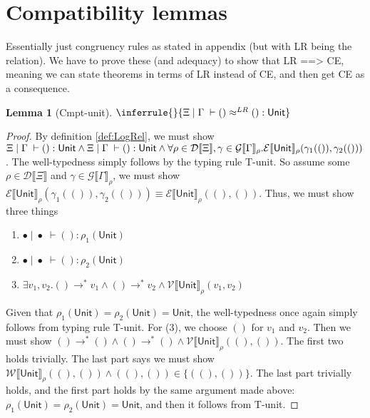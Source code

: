 \documentclass[twoside,11pt,openright]{report}
\newtheorem{lemma}[theorem]{Lemma}
\theoremstyle{definition}
\newcommand{\val}{v}
\newcommand{\TT}{()}
\newcommand{\Tunit}{\mathsf{Unit}}
\newcommand{\venv}{\Gamma}
\newcommand{\tenv}{\Xi}
\newcommand{\emptenv}{\bullet}
\newcommand{\empvenv}{\bullet}
\newcommand{\jdg}[4]{#1 \; | \; #2 \; \vdash #3 : #4}
\newcommand{\jdgRel}[6]{#1 \; | \; #2 \; \vdash #3 \approx^{#4} #5 : #6}
\newcommand{\stepS}{\rightarrow^*}
\newcommand{\WtInp}[2]{\mathcal{W} \llbracket #1 \rrbracket_{#2}}
\newcommand{\ValInp}[2]{\mathcal{V} \llbracket #1 \rrbracket_{#2}}
\newcommand{\ExpInp}[2]{\mathcal{E} \llbracket #1 \rrbracket_{#2}}
\newcommand{\VenvInp}[2]{\mathcal{G} \llbracket #1 \rrbracket_{#2}}
\newcommand{\TenvInp}[1]{\mathcal{D} \llbracket #1 \rrbracket}
\newcommand{\LogRel}[5]{\jdgRel{#1}{#2}{#3}{LR}{#4}{#5}}
\begin{document}
\section{Compatibility lemmas}
Essentially just congruency rules as stated in appendix (but with LR being the relation). We have to prove these (and adequacy) to show that LR ==> CE, meaning we can state theorems in terms of LR instead of CE, and then get CE as a consequence.
\begin{lemma}[Cmpt-unit]
  $\inferrule{ }{\LogRel{\tenv}{\venv}{\TT}{\TT}{\Tunit}}$
\end{lemma}
\begin{proof}
  By definition \ref*{def:LogRel}, we must show $\jdg{\tenv}{\venv}{\TT}{\Tunit} \land \jdg{\tenv}{\venv}{\TT}{\Tunit} \land\\ \forall \rho \in \TenvInp{\tenv}, \gamma \in \VenvInp{\venv}{\rho} . 
  \ExpInp{\Tunit}{\rho}(\gamma_1(\TT), \gamma_2(\TT))$. The well-typedness simply follows by the typing rule T-unit.
  So assume some $\rho \in \TenvInp{\tenv}$ and $\gamma \in \VenvInp{\venv}{\rho}$, we must show $\ExpInp{\Tunit}{\rho}(\gamma_1(\TT), \gamma_2(\TT)) \equiv \ExpInp{\Tunit}{\rho}(\TT, \TT)$. Thus, we must show three things
  \begin{enumerate}
    \item $\jdg{\emptenv}{\empvenv}{\TT}{\rho_1(\Tunit)}$
    \item $\jdg{\emptenv}{\empvenv}{\TT}{\rho_2(\Tunit)}$
    \item $\exists \val_1, \val_2 . \TT \stepS \val_1 \land \TT \stepS \val_2 \land \ValInp{\Tunit}{\rho}(\val_1, \val_2)$
  \end{enumerate}
  Given that $\rho_1(\Tunit) = \rho_2(\Tunit) = \Tunit$, the well-typedness once again simply follows from typing rule T-unit. For (3), we choose $\TT$ for $\val_1$ and $\val_2$. Then we must show $\TT \stepS \TT \land \TT \stepS \TT \land \ValInp{\Tunit}{\rho}(\TT, \TT)$. The first two holds trivially. The last part says we must show $\WtInp{\Tunit}{\rho}(\TT, \TT) \land (\TT, \TT) \in \{(\TT, \TT)\}$. The last part trivially holds, and the first part holds by the same argument made above: $\rho_1(\Tunit) = \rho_2(\Tunit) = \Tunit$, and then it follows from T-unit. 
\end{proof}
\end{document}

